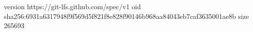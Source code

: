 version https://git-lfs.github.com/spec/v1
oid sha256:6931a6317948f9f569d5f821f8e828f90146b968aa84043eb7caf3635001ae8b
size 265693
